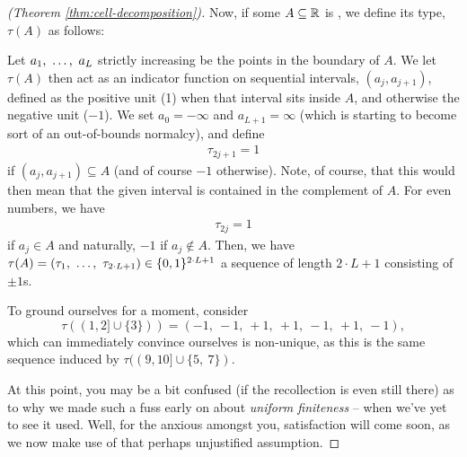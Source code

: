 \begin{proof}[\CD (Theorem \ref{thm:cell-decomposition})]

  Now, if some $A \subseteq \mathbb{R}$ is , we define its type, $\tau(A)$ as follows:
  \begin{description}
    \item Let $a_1, \ \hdots, \ a_{L}$ strictly increasing be the points in the boundary of $A$. We let $\tau(A)$ then act as an indicator function on sequential intervals, $(a_j, a_{j+1})$, defined as the positive unit (1) when that interval sits inside $A$, and otherwise the negative unit ($-1$). We set $a_0 = - \infty$ and $a_{L+1} = \infty$ (which is starting to become sort of an out-of-bounds normalcy), and define
    \begin{align*}
      \tau_{2j + 1} = 1
    \end{align*}
    if $(a_j, a_{j+1}) \subseteq A$ (and of course $-1$ otherwise). Note, of course, that this would then mean that the given interval is contained in the complement of $A$. For even numbers, we have
    \begin{align*}
      \tau_{2j} = 1
    \end{align*}
    if $a_j \in A$ and naturally, $-1$ if $a_j \not\in A$. Then, we have $\tau(A) = (\tau_1, \ \hdots, \ \tau_{2 \cdot L + 1}) \in \{0, 1\}^{2 \cdot L + 1}$ a sequence of length $2 \cdot L + 1$ consisting of $\pm 1$s.

  \end{description}

    To ground ourselves for a moment, consider $$\tau((1, 2] \cup \{ 3 \} )) = (-1,\ -1,\ +1,\ +1,\ -1,\ +1,\ -1),$$
    which can immediately convince ourselves is non-unique, as this is the same sequence induced by $\tau((9, 10] \cup \{5,\ 7\} )$.

    At this point, you may be a bit confused (if the recollection is even still there) as to why we made such a fuss early on about \emph{uniform finiteness} -- when we've yet to see it used. Well, for the anxious amongst you, satisfaction will come soon, as we now make use of that perhaps unjustified assumption.


\end{proof}
